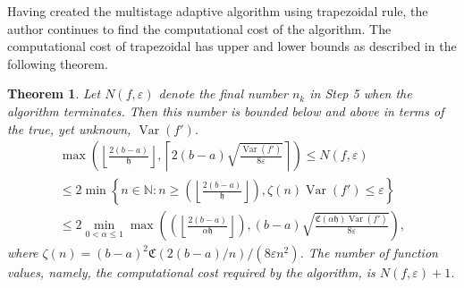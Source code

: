 \documentclass{iitthesis}
\DeclareMathOperator{\Var}{Var}
\newtheorem{theorem}{Theorem}
\theoremstyle{definition}
\theoremstyle{remark}
\begin{document}
Having created the multistage adaptive algorithm using trapezoidal rule, the author continues to find the computational cost of the algorithm. The computational cost of trapezoidal has upper and lower bounds as described in the following theorem.
\begin{theorem}\label{uppbndcosttrap}
    Let $N(f,\varepsilon)$ denote the final number $n_k$ in Step 5 when the algorithm terminates. Then this number is bounded below and above in terms of the true, yet unknown, $\Var(f')$.
    \begin{multline}\label{uppbndcosttrapineq}
        \max\left(\left\lfloor\frac{2(b-a)}{\mathfrak{h}}\right\rfloor,\left\lceil2(b-a)\sqrt{\frac{\Var(f')}{8\varepsilon}}\right\rceil\right)\leq N(f,\varepsilon)\\ \leq 2\min\left\{n\in\mathbb{N}:n\geq\left(\left\lfloor\frac{2(b-a)}{\mathfrak{h}}\right\rfloor\right),\zeta(n)\Var(f')\leq\varepsilon\right\}\\ \leq 2\min_{0<\alpha\leq1}\max\left(\left(\left\lfloor\frac{2(b-a)}{\alpha\mathfrak{h}}\right\rfloor\right),(b-a)\sqrt{\frac{\mathfrak{C}(\alpha\mathfrak{h})\Var(f')}{8\varepsilon}}\right),
    \end{multline}
    where $\zeta(n)=(b-a)^2\mathfrak{C}(2(b-a)/n)/(8\varepsilon n^2)$. The number of function values, namely, the computational cost required by the algorithm, is $N(f,\varepsilon)+1$.
\end{theorem}
\end{document}
